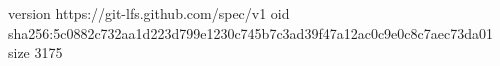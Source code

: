 version https://git-lfs.github.com/spec/v1
oid sha256:5c0882c732aa1d223d799e1230c745b7c3ad39f47a12ac0c9e0c8c7aec73da01
size 3175
